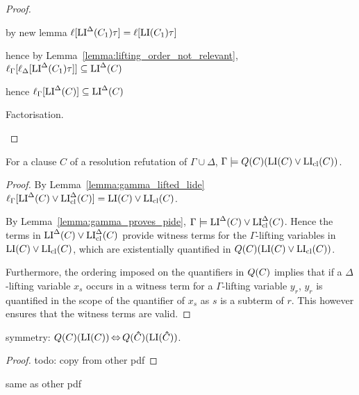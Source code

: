 \documentclass[,%
	draft=false,%
	numbers=noendperiod
	11pt,
	a4paper,
	oneside,%
	openany,
]{memoir}
\begin{document}
\begin{proof}
\begin{description}
\begin{itemize}
					by new lemma
					$\ell[ \operatorname{LI}^\Delta(C_1) \tau] = \ell[\operatorname{LI}(C_1)\tau]$ 

					hence by Lemma~\ref{lemma:lifting_order_not_relevant}, $\ell_{\Gamma}[\ell_{\Delta}[\operatorname{LI}^\Delta(C_1)\tau]] \subseteq \operatorname{LI}^\Delta(C)$

					hence $\ell_{\Gamma}[\operatorname{LI}^\Delta(C)] \subseteq \operatorname{LI}^\Delta(C)$



			\end{itemize}




		\item{} Factorisation.
	\end{description}

\end{proof}


\begin{lemma}
	For a clause $C$ of a resolution refutation of $\Gamma\cup\Delta$, 
	$\Gamma\models Q(C)(\operatorname{LI}(C) \lor \operatorname{LI}_{\operatorname{cl}}(C))$.
\end{lemma}
\begin{proof}
	By Lemma~\ref{lemma:gamma_lifted_lide}
	$\ell_{\Gamma}[ \operatorname{LI}^\Delta(C) \lor \operatorname{LI}_{\operatorname{cl}}^\Delta(C)] = \operatorname{LI}(C) \lor \operatorname{LI}_{\operatorname{cl}}(C)$.

	By Lemma~\ref{lemma:gamma_proves_pide},
	$\Gamma\models \operatorname{LI}^\Delta(C) \lor \operatorname{LI}_{\operatorname{cl}}^\Delta(C)$. 
	Hence the terms in $\operatorname{LI}^\Delta(C) \lor \operatorname{LI}_{\operatorname{cl}}^\Delta(C)$ provide witness terms for the $\Gamma$-lifting variables in $\operatorname{LI}(C) \lor \operatorname{LI}_{\operatorname{cl}}(C)$, which are existentially quantified in $Q(C) (\operatorname{LI}(C) \lor \operatorname{LI}_{\operatorname{cl}}(C))$.

	Furthermore, the ordering imposed on the quantifiers in $Q(C)$ implies that if a $\Delta$-lifting variable $x_s$ occurs in a witness term for a $\Gamma$-lifting variable $y_r$, $y_r$ is quantified in the scope of the quantifier of $x_s$ as $s$ is a subterm of $r$.
	This however ensures that the witness terms are valid.
\end{proof}

\begin{lemma}
	\label{lemma:li_symmetry}
	symmetry: $Q(C)(\operatorname{LI}(C)) \operatorname{\Leftrightarrow} Q(\bm\hat C)(\operatorname{LI}(\bm\hat C))$.
\end{lemma}
\begin{proof}
	todo: copy from other pdf
\end{proof}

\begin{thm}
	same as other pdf
\end{thm}
\end{document}

